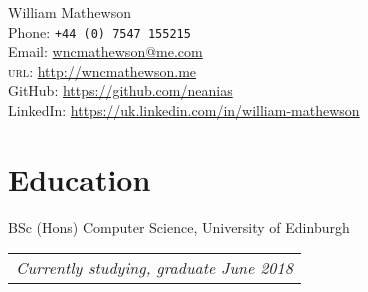 \documentclass[10pt, a4paper]{article}
\newcommand{\years}[1]{\marginnote{\scriptsize #1}}
\begin{document}
{\LARGE William Mathewson}\\[1cm]

Phone: \texttt{+44 (0) 7547 155215}\\
Email: \href{mailto:wncmathewson@me.com}{wncmathewson@me.com}\\
\textsc{url}: \href{http://wncmathewson.me}{http://wncmathewson.me}\\
GitHub: \href{https://github.com/neanias}{https://github.com/neanias}\\
LinkedIn: \href{https://uk.linkedin.com/in/william-mathewson}{https://uk.linkedin.com/in/william-mathewson}




\section*{Education}
\years{2014-2018} BSc (Hons) Computer Science, University of Edinburgh\\
\begin{tabular}{l}
  \emph{Currently studying, graduate June 2018}
\end{tabular}
\end{document}
